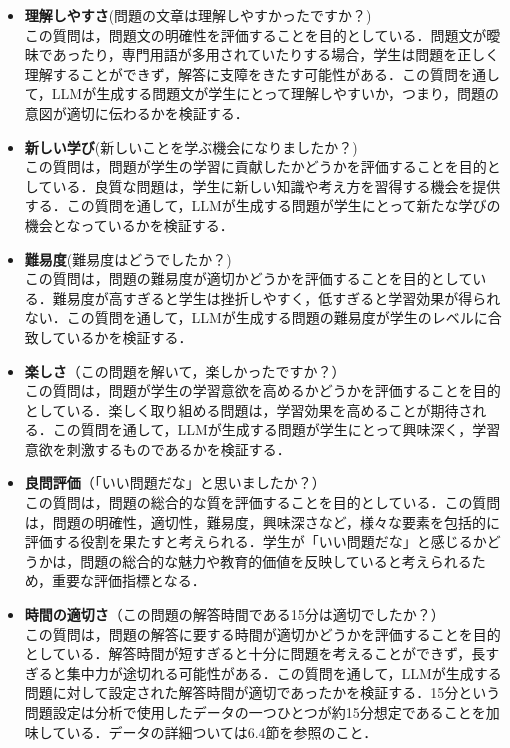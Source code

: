 \documentclass[11pt]{jreport}
\begin{document}
\begin{itemize}
    \item \textbf{理解しやすさ}(問題の文章は理解しやすかったですか？) \\この質問は，問題文の明確性を評価することを目的としている．問題文が曖昧であったり，専門用語が多用されていたりする場合，学生は問題を正しく理解することができず，解答に支障をきたす可能性がある．この質問を通して，LLMが生成する問題文が学生にとって理解しやすいか，つまり，問題の意図が適切に伝わるかを検証する．
    \item \textbf{新しい学び}(新しいことを学ぶ機会になりましたか？) \\この質問は，問題が学生の学習に貢献したかどうかを評価することを目的としている．良質な問題は，学生に新しい知識や考え方を習得する機会を提供する．この質問を通して，LLMが生成する問題が学生にとって新たな学びの機会となっているかを検証する．
    \item \textbf{難易度}(難易度はどうでしたか？) \\この質問は，問題の難易度が適切かどうかを評価することを目的としている．難易度が高すぎると学生は挫折しやすく，低すぎると学習効果が得られない．この質問を通して，LLMが生成する問題の難易度が学生のレベルに合致しているかを検証する．
    \item \textbf{楽しさ}（この問題を解いて，楽しかったですか？） \\この質問は，問題が学生の学習意欲を高めるかどうかを評価することを目的としている．楽しく取り組める問題は，学習効果を高めることが期待される．この質問を通して，LLMが生成する問題が学生にとって興味深く，学習意欲を刺激するものであるかを検証する．
    \item \textbf{良問評価}（「いい問題だな」と思いましたか？）\\この質問は，問題の総合的な質を評価することを目的としている．この質問は，問題の明確性，適切性，難易度，興味深さなど，様々な要素を包括的に評価する役割を果たすと考えられる．学生が「いい問題だな」と感じるかどうかは，問題の総合的な魅力や教育的価値を反映していると考えられるため，重要な評価指標となる．
    \item \textbf{時間の適切さ}（この問題の解答時間である15分は適切でしたか？）\\この質問は，問題の解答に要する時間が適切かどうかを評価することを目的としている．解答時間が短すぎると十分に問題を考えることができず，長すぎると集中力が途切れる可能性がある．この質問を通して，LLMが生成する問題に対して設定された解答時間が適切であったかを検証する．15分という問題設定は分析で使用したデータの一つひとつが約15分想定であることを加味している．データの詳細ついては6.4節を参照のこと．
\end{itemize}
\end{document}
